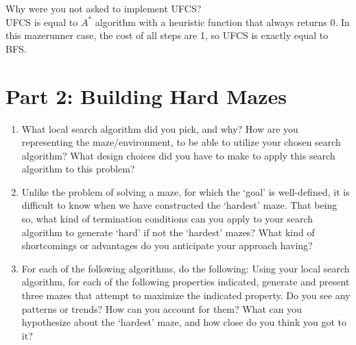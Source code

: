 \documentclass[letter]{article}
\begin{document}
\begin{bonus}
	\item {Why were you not asked to implement UFCS?} \\
	UFCS is equal to $ A^* $ algorithm with a heuristic function that always returns 0. In this mazerunner case, the cost of all steps are 1, so UFCS is exactly equal to BFS.
\end{bonus}

\section{Part 2: Building Hard Mazes}
	\label{sec:Part 2: Building Hard Mazes}
	\begin{enumerate}[resume]
		
		\item {What local search algorithm did you pick, and why? How are you representing the maze/environment, to be able to utilize your chosen search algorithm? What design choices did you have to make to apply this search algorithm to this problem?}
		
		\item {Unlike the problem of solving a maze, for which the ‘goal’ is well-defined, it is difficult to know when we have constructed the ‘hardest’ maze. That being so, what kind of termination conditions can you apply to your search algorithm to generate ‘hard’ if not the ‘hardest’ mazes? What kind of shortcomings or advantages do you anticipate your approach having?}
		
		\item {For each of the following algorithms, do the following: Using your local search algorithm, for each of the following properties indicated, generate and present three mazes that attempt to maximize the indicated property. Do you see any patterns or trends? How can you account for them? What can you hypothesize about the ‘hardest’ maze, and how close do you think you got to it?}
	\end{enumerate}
\end{document}
